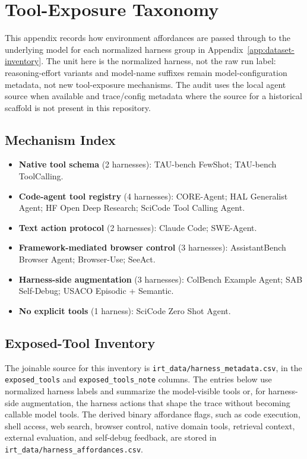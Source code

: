 \section{Tool-Exposure Taxonomy}
\label{app:tool-exposure-taxonomy}

This appendix records how environment affordances are passed through to the
underlying model for each normalized harness group in
Appendix~\ref{app:dataset-inventory}. The unit here is the normalized harness,
not the raw run label: reasoning-effort variants and model-name suffixes remain
model-configuration metadata, not new tool-exposure mechanisms. The audit uses
the local agent source when available and trace/config metadata where the
source for a historical scaffold is not present in this repository.

\subsection{Mechanism Index}

\begingroup
\footnotesize
\begin{itemize}
\item \textbf{Native tool schema} (2 harnesses): TAU-bench FewShot;
TAU-bench ToolCalling.
\item \textbf{Code-agent tool registry} (4 harnesses): CORE-Agent; HAL
Generalist Agent; HF Open Deep Research; SciCode Tool Calling Agent.
\item \textbf{Text action protocol} (2 harnesses): Claude Code; SWE-Agent.
\item \textbf{Framework-mediated browser control} (3 harnesses):
AssistantBench Browser Agent; Browser-Use; SeeAct.
\item \textbf{Harness-side augmentation} (3 harnesses): ColBench Example
Agent; SAB Self-Debug; USACO Episodic + Semantic.
\item \textbf{No explicit tools} (1 harness): SciCode Zero Shot Agent.
\end{itemize}
\endgroup

\subsection{Exposed-Tool Inventory}

The joinable source for this inventory is
\texttt{irt\_data/harness\_metadata.csv}, in the \texttt{exposed\_tools} and
\texttt{exposed\_tools\_note} columns. The entries below use normalized harness
labels and summarize the model-visible tools or, for harness-side augmentation,
the harness actions that shape the trace without becoming callable model tools.
The derived binary affordance flags, such as code execution, shell access, web
search, browser control, native domain tools, retrieval context, external
evaluation, and self-debug feedback, are stored in
\texttt{irt\_data/harness\_affordances.csv}.

